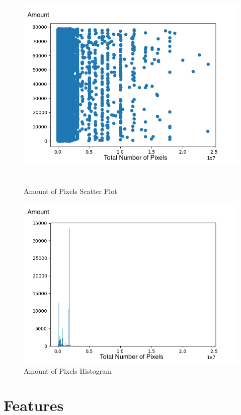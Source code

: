 \begin{figure}
	\includegraphics[width=\textwidth, height=10.5cm]{images/numPixels}
	\caption{Amount of Pixels Scatter Plot}
	\label{numPixels}
\end{figure}

\begin{figure}
	\includegraphics[width=\textwidth]{images/numPixelsHist}
	\caption{Amount of Pixels Histogram}
	\label{numPixelsHist}
\end{figure}


\chapter{Features}

